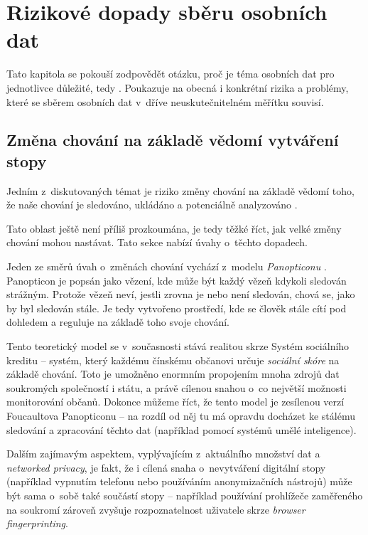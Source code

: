 \chapter{Rizikové dopady sběru osobních dat}

Tato kapitola se pokouší zodpovědět otázku, proč je téma osobních dat pro jednotlivce důležité, tedy . Poukazuje na obecná i konkrétní rizika a problémy, které se sběrem osobních dat v~dříve neuskutečnitelném měřítku souvisí. 


\section{Změna chování na základě vědomí vytváření stopy}

Jedním z~diskutovaných témat je riziko změny chování na základě vědomí toho, že naše chování je sledováno, ukládáno a potenciálně analyzováno \citep{behavior-changes}.

Tato oblast ještě není příliš prozkoumána, je tedy těžké říct, jak velké změny chování mohou nastávat. Tato sekce nabízí úvahy o~těchto dopadech.

Jeden ze směrů úvah o~změnách chování vychází z~modelu \textit{Panopticonu} \citep{panopticon}. Panopticon je popsán jako vězení, kde může být každý vězeň kdykoli sledován strážným. Protože vězeň neví, jestli zrovna je nebo není sledován, chová se, jako by byl sledován stále. Je tedy vytvořeno prostředí, kde se člověk stále cítí pod dohledem a reguluje na základě toho svoje chování.

Tento teoretický model se v~současnosti stává realitou skrze Systém sociálního kreditu -- systém, který každému čínskému občanovi určuje \textit{sociální skóre} na základě chování. Toto je umožněno enormním propojením mnoha zdrojů dat soukromých společností i státu, a právě cílenou snahou o~co největší možnosti monitorování občanů. Dokonce můžeme říct, že tento model je zesílenou verzí Foucaultova Panopticonu -- na rozdíl od něj tu má opravdu docházet ke stálému sledování a zpracování těchto dat (například pomocí systémů umělé inteligence).

Dalším zajímavým aspektem, vyplývajícím z~aktuálního množství dat a \textit{networked privacy}, je fakt, že i cílená snaha o~nevytváření digitální stopy (například vypnutím telefonu nebo používáním anonymizačních nástrojů) může být sama o~sobě také součástí stopy -- například používání prohlížeče zaměřeného na soukromí zároveň zvyšuje rozpoznatelnost uživatele skrze \textit{browser fingerprinting}.


